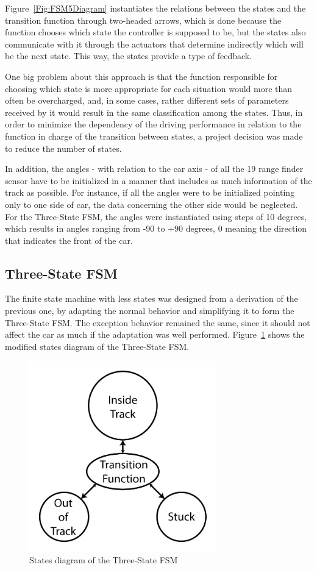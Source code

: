 	Figure~\ref{Fig:FSM5Diagram} instantiates the relations between the states and the transition function through two-headed arrows, which is done because the function chooses which state the controller is supposed to be, but the states also communicate with it through the actuators that determine indirectly which will be the next state. This way, the states provide a type of feedback.
	
	One big problem about this approach is that the function responsible for choosing which state is more appropriate for each situation would more than often be overcharged, and, in some cases, rather different sets of parameters received by it would result in the same classification among the states. Thus, in order to minimize the dependency of the driving performance in relation to the function in charge of the transition between states, a project decision was made to reduce the number of states.
	
	In addition, the angles - with relation to the car axis - of all the 19 range finder sensor have to be initialized in a manner that includes as much information of the track as possible. For instance, if all the angles were to be initialized pointing only to one side of car, the data concerning the other side would be neglected. For the Three-State FSM, the angles were instantiated using steps of 10 degrees, which results in angles ranging from -90 to +90 degrees, 0 meaning the direction that indicates the front of the car.
		
\subsection{Three-State FSM} \label{subsec:FSM3}
	
	The finite state machine with less states was designed from a derivation of the previous one, by adapting the normal behavior and simplifying it to form the Three-State FSM. The exception behavior remained the same, since it should not affect the car as much if the adaptation was well performed. Figure~\ref{Fig:FSM3Diagram} shows the modified states diagram of the Three-State FSM.
	
	\begin{figure}[h]
		
		\centering
		\includegraphics[width=230pt]{ThreeStateFSM}
		\caption{States diagram of the Three-State FSM}
		\label{Fig:FSM3Diagram}
		
	\end{figure}
	
